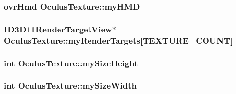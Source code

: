 \subsubsection[{\texorpdfstring{my\+H\+MD}{myHMD}}]{\setlength{\rightskip}{0pt plus 5cm}ovr\+Hmd Oculus\+Texture\+::my\+H\+MD\hspace{0.3cm}{\ttfamily [protected]}}\hypertarget{class_oculus_texture_a15c4e9c827747a8f864041baab7771ee}{}\label{class_oculus_texture_a15c4e9c827747a8f864041baab7771ee}
\subsubsection[{\texorpdfstring{my\+Render\+Targets}{myRenderTargets}}]{\setlength{\rightskip}{0pt plus 5cm}I\+D3\+D11\+Render\+Target\+View$\ast$ Oculus\+Texture\+::my\+Render\+Targets\mbox{[}T\+E\+X\+T\+U\+R\+E\+\_\+\+C\+O\+U\+NT\mbox{]}\hspace{0.3cm}{\ttfamily [protected]}}\hypertarget{class_oculus_texture_a5d69afb8a823b45fd936437f2c0d5b87}{}\label{class_oculus_texture_a5d69afb8a823b45fd936437f2c0d5b87}
\subsubsection[{\texorpdfstring{my\+Size\+Height}{mySizeHeight}}]{\setlength{\rightskip}{0pt plus 5cm}int Oculus\+Texture\+::my\+Size\+Height\hspace{0.3cm}{\ttfamily [protected]}}\hypertarget{class_oculus_texture_afddb31ca4baf9069c37be3008edbb1a9}{}\label{class_oculus_texture_afddb31ca4baf9069c37be3008edbb1a9}
\subsubsection[{\texorpdfstring{my\+Size\+Width}{mySizeWidth}}]{\setlength{\rightskip}{0pt plus 5cm}int Oculus\+Texture\+::my\+Size\+Width\hspace{0.3cm}{\ttfamily [protected]}}\hypertarget{class_oculus_texture_afc8b36b0000c604578ad62c8ee736315}{}\label{class_oculus_texture_afc8b36b0000c604578ad62c8ee736315}
